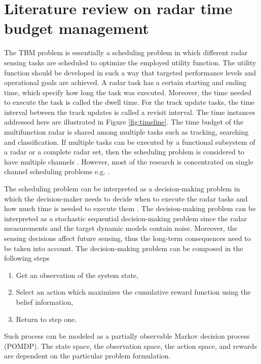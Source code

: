\documentclass[english, 12pt, a4paper, elec, utf8, a-1b, online]{aaltothesis}
\begin{document}
\newpage
\section{Literature review on radar time budget management} \label{sec:literature_review}

The TBM problem is essentially a scheduling problem in which different radar sensing tasks are scheduled to optimize the employed utility function.
The utility function should be developed in such a way that targeted performance levels and operational goals are achieved.
A radar task has a certain starting and ending time, which specify how long the task was executed.
Moreover, the time needed to execute the task is called the dwell time.
For the track update tasks, the time interval between the track updates is called a revisit interval.
The time instances addressed here are illustrated in Figure \ref{fig:timeline}.
The time budget of the multifunction radar is shared among multiple tasks such as tracking, searching and classification.
If multiple tasks can be executed by a functional subsystem of a radar or a complete radar set, then the scheduling problem is considered to have multiple channels \cite{Shaghaghi2018}.
However, most of the research is concentrated on single channel scheduling problems e.g. \cite{Charlish2015a, Byrne2015, Byrne2016, Esfahani2012, Wintenby2006}.

The scheduling problem can be interpreted as a decision-making problem in which the decision-maker needs to decide when to execute the radar tasks and how much time is needed to execute them \cite{Wintenby2006}.  
The decision-making problem can be interpreted as a stochastic sequential decision-making problem since the radar measurements and the target dynamic models contain noise.
Moreover, the sensing decisions affect future sensing, thus the long-term consequences need to be taken into account.
The decision-making problem can be composed in the following steps 
\begin{enumerate}
    \item Get an observation of the system state,
    \item Select an action which maximizes the cumulative reward function using the belief information,
    \item Return to step one.
\end{enumerate}
Such process can be modeled as a partially observable Markov decision process (POMDP).
The state space, the observation space, the action space, and rewards are dependent on the particular problem formulation.
\end{document}
